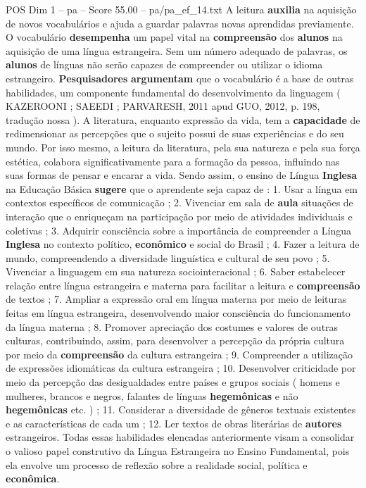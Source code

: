 \begin{textsample}{POS Dim 1 – pa – Score 55.00 – pa/pa\_ef\_14.txt}
A leitura \textbf{auxilia} na aquisição de novos vocabulários e ajuda a guardar palavras novas aprendidas previamente.
O vocabulário \textbf{desempenha} um papel vital na \textbf{compreensão} dos \textbf{alunos} na aquisição de uma língua estrangeira.
Sem um número adequado de palavras, os \textbf{alunos} de línguas não serão capazes de compreender ou utilizar o idioma estrangeiro. \textbf{Pesquisadores} \textbf{argumentam} que o vocabulário é a base de outras habilidades, um componente fundamental do desenvolvimento da linguagem ( KAZEROONI ; SAEEDI ; PARVARESH, 2011 apud GUO, 2012, p. 198, tradução nossa ).
A literatura, enquanto expressão da vida, tem a \textbf{capacidade} de redimensionar as percepções que o sujeito possui de suas experiências e do seu mundo.
Por isso mesmo, a leitura da literatura, pela sua natureza e pela sua força estética, colabora significativamente para a formação da pessoa, influindo nas suas formas de pensar e encarar a vida.
Sendo assim, o ensino de Língua \textbf{Inglesa} na Educação Básica \textbf{sugere} que o aprendente seja capaz de : 1.
Usar a língua em contextos específicos de comunicação ; 2.
Vivenciar em sala de \textbf{aula} situações de interação que o enriqueçam na participação por meio de atividades individuais e coletivas ; 3.
Adquirir consciência sobre a importância de compreender a Língua \textbf{Inglesa} no contexto político, \textbf{econômico} e social do Brasil ; 4.
Fazer a leitura de mundo, compreendendo a diversidade linguística e cultural de seu povo ; 5.
Vivenciar a linguagem em sua natureza sociointeracional ; 6.
Saber estabelecer relação entre língua estrangeira e materna para facilitar a leitura e \textbf{compreensão} de textos ; 7.
Ampliar a expressão oral em língua materna por meio de leituras feitas em língua estrangeira, desenvolvendo maior consciência do funcionamento da língua materna ; 8.
Promover apreciação dos costumes e valores de outras culturas, contribuindo, assim, para desenvolver a percepção da própria cultura por meio da \textbf{compreensão} da cultura estrangeira ; 9.
Compreender a utilização de expressões idiomáticas da cultura estrangeira ; 10.
Desenvolver criticidade por meio da percepção das desigualdades entre países e grupos sociais ( homens e mulheres, brancos e negros, falantes de línguas \textbf{hegemônicas} e não \textbf{hegemônicas} etc. ) ; 11.
Considerar a diversidade de gêneros textuais existentes e as características de cada um ; 12.
Ler textos de obras literárias de \textbf{autores} estrangeiros.
Todas essas habilidades elencadas anteriormente visam a consolidar o valioso papel construtivo da Língua Estrangeira no Ensino Fundamental, pois ela envolve um processo de reflexão sobre a realidade social, política e \textbf{econômica}.

\end{textsample}
